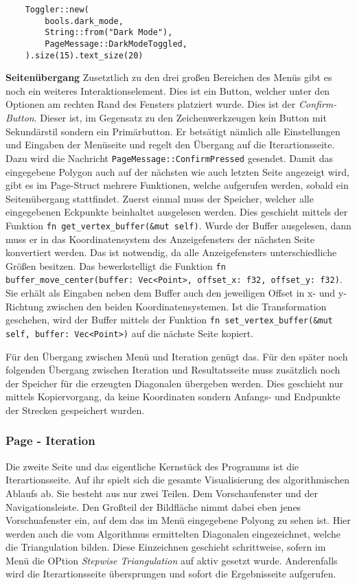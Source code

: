 \begin{lstlisting}
    Toggler::new(
        bools.dark_mode,
        String::from("Dark Mode"),
        PageMessage::DarkModeToggled,
    ).size(15).text_size(20)
\end{lstlisting}\pagebreak

\textbf{\large{Seitenübergang}}\linebreak
Zusetztlich zu den drei großen Bereichen des Menüs gibt es noch ein weiteres Interaktionselement. Dies ist ein Button, welcher unter den Optionen am rechten Rand des Fensters platziert wurde.
Dies ist der \emph{Confirm-Button}. Dieser ist, im Gegensatz zu den Zeichenwerkzeugen kein Button mit Sekundärstil sondern ein Primärbutton. Er betsätigt nämlich alle Einstellungen und Eingaben der Menüseite und
regelt den Übergang auf die Iterartionsseite. Dazu wird die Nachricht \lstinline{PageMessage::ConfirmPressed} gesendet. Damit das eingegebene Polygon auch auf der nächsten wie auch letzten Seite angezeigt wird, gibt es im Page-Struct
mehrere Funktionen, welche aufgerufen werden, sobald ein Seitenübergang stattfindet. Zuerst einmal muss der Speicher, welcher alle eingegebenen Eckpunkte beinhaltet ausgelesen werden. Dies geschieht mittels der Funktion 
\lstinline{fn get_vertex_buffer(&mut self)}. Wurde der Buffer ausgelesen, dann muss er in das Koordinatensystem des Anzeigefensters der nächsten Seite konvertiert werden. Das ist notwendig, da alle Anzeigefensters unterschiedliche Größen besitzen.
Das bewerkstelligt die Funktion \lstinline{fn buffer_move_center(buffer: Vec<Point>, offset_x: f32, offset_y: f32)}. Sie erhält als Eingaben neben dem Buffer auch den jeweiligen Offset in x- und y-Richtung
zwischen den beiden Koordinatensystemen. Ist die Transformation geschehen, wird der Buffer mittels der Funktion \lstinline{fn set_vertex_buffer(&mut self, buffer: Vec<Point>)} auf die nächste Seite kopiert.

Für den Übergang zwischen Menü und Iteration genügt das. Für den später noch folgenden Übergang zwischen Iteration und Resultatsseite muss zusätzlich noch der Speicher für die erzeugten Diagonalen übergeben werden.
Dies geschieht nur mittels Kopiervorgang, da keine Koordinaten sondern Anfangs- und Endpunkte der Strecken gespeichert wurden.

\subsubsection{Page - Iteration}

Die zweite Seite und das eigentliche Kernstück des Programms ist die Iterartionsseite. Auf ihr spielt sich die gesamte Visualisierung des algorithmischen Ablaufs ab.
Sie besteht aus nur zwei Teilen. Dem Vorschaufenster und der Navigationsleiste. Den Großteil der Bildfläche nimmt dabei eben jenes Vorschuafenster ein, auf dem das im Menü eingegebene 
Polyong zu sehen ist. Hier werden auch die vom Algorithmus ermittelten Diagonalen eingezeichnet, welche die Triangulation bilden. Diese Einzeichnen geschieht schrittweise, sofern 
im Menü die OPtion \emph{Stepwise Triangulation} auf aktiv gesetzt wurde. Anderenfalls wird die Iterartionsseite übersprungen und sofort die Ergebnisseite aufgerufen.

